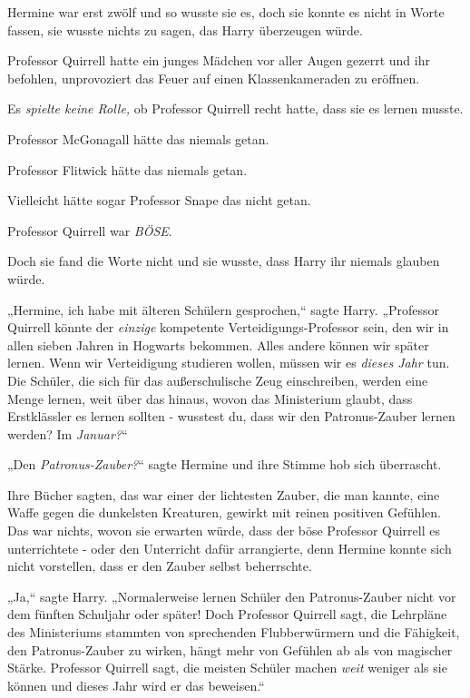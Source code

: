 {Hermine war erst zwölf und so wusste sie es, doch sie konnte es nicht in Worte fassen, sie wusste nichts zu sagen, das Harry überzeugen würde.

Professor Quirrell hatte ein junges Mädchen vor aller Augen gezerrt und ihr befohlen, unprovoziert das Feuer auf einen Klassenkameraden zu eröffnen.

Es \emph{spielte keine Rolle,} ob Professor Quirrell recht hatte, dass sie es lernen musste.

Professor McGonagall hätte das niemals getan.

Professor Flitwick hätte das niemals getan.

Vielleicht hätte sogar Professor Snape das nicht getan.

Professor Quirrell war \emph{BÖSE}.

Doch sie fand die Worte nicht und sie wusste, dass Harry ihr niemals glauben würde.

„Hermine, ich habe mit älteren Schülern gesprochen,“ sagte Harry. „Professor Quirrell könnte der \emph{einzige} kompetente Verteidigungs-Professor sein, den wir in allen sieben Jahren in Hogwarts bekommen. Alles andere können wir später lernen. Wenn wir Verteidigung studieren wollen, müssen wir es \emph{dieses Jahr} tun. Die Schüler, die sich für das außerschulische Zeug einschreiben, werden eine Menge lernen, weit über das hinaus, wovon das Ministerium glaubt, dass Erstklässler es lernen sollten - wusstest du, dass wir den Patronus-Zauber lernen werden? Im \emph{Januar?}“

„Den \emph{Patronus-Zauber?}“ sagte Hermine und ihre Stimme hob sich überrascht.

Ihre Bücher sagten, das war einer der lichtesten Zauber, die man kannte, eine Waffe gegen die dunkelsten Kreaturen, gewirkt mit reinen positiven Gefühlen. Das war nichts, wovon sie erwarten würde, dass der böse Professor Quirrell es unterrichtete - oder den Unterricht dafür arrangierte, denn Hermine konnte sich nicht vorstellen, dass er den Zauber selbst beherrschte.

„Ja,“ sagte Harry. „Normalerweise lernen Schüler den Patronus-Zauber nicht vor dem fünften Schuljahr oder später! Doch Professor Quirrell sagt, die Lehrpläne des Ministeriums stammten von sprechenden Flubberwürmern und die Fähigkeit, den Patronus-Zauber zu wirken, hängt mehr von Gefühlen ab als von magischer Stärke. Professor Quirrell sagt, die meisten Schüler machen \emph{weit} weniger als sie können und dieses Jahr wird er das beweisen.“

}
